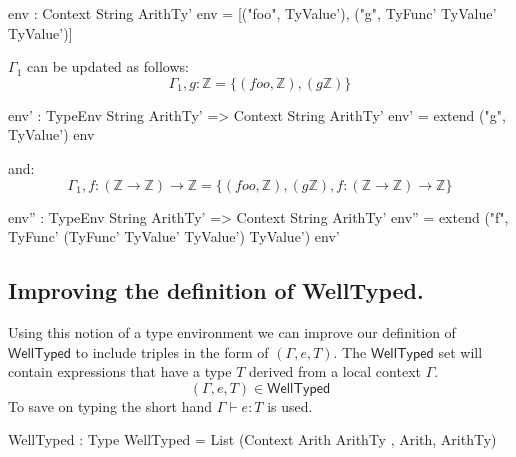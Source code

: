 \begin{code}
env : Context String ArithTy'
env = [("foo", TyValue'), ("g", TyFunc' TyValue' TyValue')]
\end{code}

\noindent
$\Gamma_{1}$ can be updated as follows:
\[
\Gamma_{1},g:\mathbb{Z} =\{(foo,\mathbb{Z}),(g\mathbb{Z})\}
\]
\begin{code}
env' : TypeEnv String ArithTy' => Context String ArithTy'
env' = extend ("g", TyValue') env
\end{code}
\noindent
and:
\[
\Gamma_{1},f:(\mathbb{Z}\rightarrow\mathbb{Z})\rightarrow\mathbb{Z} =\{(foo,\mathbb{Z}),(g\mathbb{Z}),f:(\mathbb{Z}\rightarrow\mathbb{Z})\rightarrow\mathbb{Z}\}
\]
\begin{code}
env'' : TypeEnv String ArithTy' => Context String ArithTy'
env'' = extend ("f", TyFunc' (TyFunc' TyValue' TyValue') TyValue') env'
\end{code}

\subsection{Improving the definition of \textsf{WellTyped}.}
\label{sec:types:example}

Using this notion of a type environment we can improve our definition of $\mathsf{WellTyped}$ to include triples in the form of $(\Gamma,e,T)$.
The $\mathsf{WellTyped}$ set will contain expressions that have a type $T$ derived from a local context $\Gamma$.
\[
(\Gamma,e,T)\in\mathsf{WellTyped}
\]
\noindent
To save on typing the short hand $\Gamma\vdash e:T$ is used.

\begin{code}
WellTyped : Type
WellTyped = List (Context Arith ArithTy , Arith, ArithTy)
\end{code}

